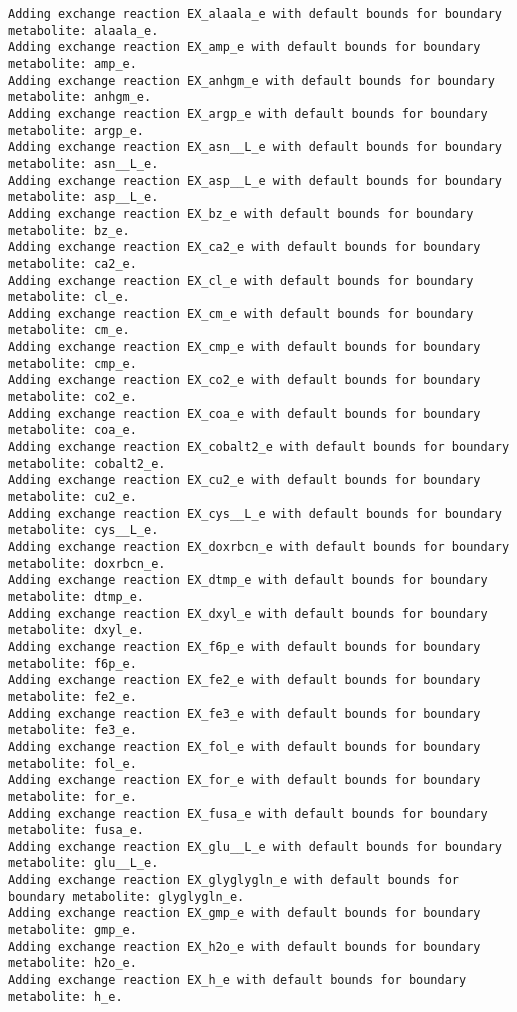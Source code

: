 \documentclass[
  letterpaper,
  DIV=11,
  numbers=noendperiod]{scrartcl}
\begin{document}
\begin{verbatim}
Adding exchange reaction EX_alaala_e with default bounds for boundary metabolite: alaala_e.
Adding exchange reaction EX_amp_e with default bounds for boundary metabolite: amp_e.
Adding exchange reaction EX_anhgm_e with default bounds for boundary metabolite: anhgm_e.
Adding exchange reaction EX_argp_e with default bounds for boundary metabolite: argp_e.
Adding exchange reaction EX_asn__L_e with default bounds for boundary metabolite: asn__L_e.
Adding exchange reaction EX_asp__L_e with default bounds for boundary metabolite: asp__L_e.
Adding exchange reaction EX_bz_e with default bounds for boundary metabolite: bz_e.
Adding exchange reaction EX_ca2_e with default bounds for boundary metabolite: ca2_e.
Adding exchange reaction EX_cl_e with default bounds for boundary metabolite: cl_e.
Adding exchange reaction EX_cm_e with default bounds for boundary metabolite: cm_e.
Adding exchange reaction EX_cmp_e with default bounds for boundary metabolite: cmp_e.
Adding exchange reaction EX_co2_e with default bounds for boundary metabolite: co2_e.
Adding exchange reaction EX_coa_e with default bounds for boundary metabolite: coa_e.
Adding exchange reaction EX_cobalt2_e with default bounds for boundary metabolite: cobalt2_e.
Adding exchange reaction EX_cu2_e with default bounds for boundary metabolite: cu2_e.
Adding exchange reaction EX_cys__L_e with default bounds for boundary metabolite: cys__L_e.
Adding exchange reaction EX_doxrbcn_e with default bounds for boundary metabolite: doxrbcn_e.
Adding exchange reaction EX_dtmp_e with default bounds for boundary metabolite: dtmp_e.
Adding exchange reaction EX_dxyl_e with default bounds for boundary metabolite: dxyl_e.
Adding exchange reaction EX_f6p_e with default bounds for boundary metabolite: f6p_e.
Adding exchange reaction EX_fe2_e with default bounds for boundary metabolite: fe2_e.
Adding exchange reaction EX_fe3_e with default bounds for boundary metabolite: fe3_e.
Adding exchange reaction EX_fol_e with default bounds for boundary metabolite: fol_e.
Adding exchange reaction EX_for_e with default bounds for boundary metabolite: for_e.
Adding exchange reaction EX_fusa_e with default bounds for boundary metabolite: fusa_e.
Adding exchange reaction EX_glu__L_e with default bounds for boundary metabolite: glu__L_e.
Adding exchange reaction EX_glyglygln_e with default bounds for boundary metabolite: glyglygln_e.
Adding exchange reaction EX_gmp_e with default bounds for boundary metabolite: gmp_e.
Adding exchange reaction EX_h2o_e with default bounds for boundary metabolite: h2o_e.
Adding exchange reaction EX_h_e with default bounds for boundary metabolite: h_e.

\end{verbatim}
\end{document}
